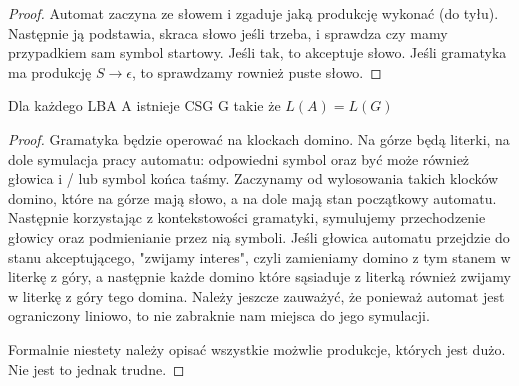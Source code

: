 \begin{proof} 
Automat zaczyna ze słowem i zgaduje jaką produkcję wykonać (do tyłu). Następnie ją podstawia, skraca słowo jeśli trzeba, i sprawdza czy mamy przypadkiem sam symbol startowy. Jeśli tak, to akceptuje słowo.
Jeśli gramatyka ma produkcję \(S \rightarrow \epsilon\), to sprawdzamy rownież puste słowo.
\end{proof}

\begin{theorem}
    Dla każdego LBA A istnieje CSG G takie że \( L(A) = L(G) \)
\end{theorem}

\begin{proof}
Gramatyka będzie operować na klockach domino. Na górze będą literki, na dole symulacja pracy automatu: odpowiedni symbol oraz być może również głowica i / lub symbol końca taśmy. Zaczynamy od wylosowania takich klocków domino, które na górze mają słowo, a na dole mają stan początkowy automatu.
Następnie korzystając z kontekstowości gramatyki, symulujemy przechodzenie głowicy oraz podmienianie przez nią symboli. Jeśli głowica automatu przejdzie do stanu akceptującego, "zwijamy interes", czyli zamieniamy domino z tym stanem w literkę z góry, a następnie każde domino które sąsiaduje
z literką również zwijamy w literkę z góry tego domina. Należy jeszcze zauważyć, że ponieważ automat jest ograniczony liniowo, to nie zabraknie nam miejsca do jego symulacji.

Formalnie niestety należy opisać wszystkie możwlie produkcje, których jest dużo. Nie jest to jednak trudne.
\end{proof}